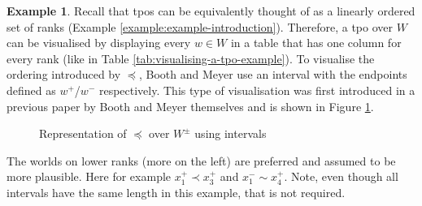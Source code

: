\documentclass[english, 12pt]{scrartcl}
\theoremstyle{definition}
\newtheorem{example}{Example}
\theoremstyle{definition}
\theoremstyle{definition}
\begin{document}
\begin{example}
    \label{example:example-intervals}
    Recall that tpos can be equivalently thought of as a linearly ordered set of ranks (Example \ref{example:example-introduction}). Therefore, a tpo over $W$ can be visualised by displaying every $w \in W$ in a table that has one column for every rank (like in Table \ref{tab:visualising-a-tpo-example}). To visualise the ordering introduced by $\preceq$, Booth and Meyer use an interval with the endpoints defined as $w^{+}$/$w^{-}$ respectively. This type of visualisation was first introduced in a previous paper by Booth and Meyer themselves \cite{Booth2007} and is shown in Figure \ref{fig:example-visualisation-scatterplot}.
        
    \begin{figure}[H]
        \centering
        \caption{Representation of $\preceq$ over $W^{\pm}$ using intervals}
        \label{fig:example-visualisation-scatterplot}
    \end{figure}
    
   The worlds on lower ranks (more on the left) are preferred and assumed to be more plausible. Here for example $x_{1}^{+} \prec x_{3}^{+}$ and $x_{1}^{-} \sim x_{4}^{+}$. Note, even though all intervals have the same length in this example, that is not required.
\end{example}
\end{document}
